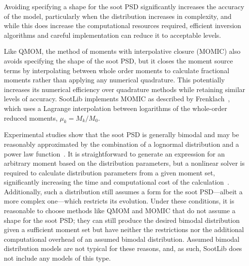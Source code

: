 \documentclass[preprint,letterpaper]{elsarticle}
\begin{document}
Avoiding specifying a shape for the soot PSD significantly increases the accuracy of the model, particularly when the distribution increases in complexity, and while this does increase the computational resources required, efficient inversion algorithms and careful implementation can reduce it to acceptable levels.


Like QMOM, the method of moments with interpolative closure (MOMIC) also avoids specifying the shape of the soot PSD, but it closes the moment source terms by interpolating between whole order moments to calculate fractional moments rather than applying any numerical quadrature. This potentially increases its numerical efficiency over quadrature methods while retaining similar levels of accuracy. SootLib implements MOMIC as described by Frenklach~\cite{Frenklach_2002b,Frenklach_1987}, which uses a Lagrange interpolation between logarithms of the  whole-order reduced moments, $\mu_k = M_k/M_0$.

Experimental studies show that the soot PSD is generally bimodal and may be reasonably approximated by the combination of a lognormal distribution and a power law function~\cite{Wang_2011}. It is straightforward to generate an expression for an arbitrary moment based on the distribution parameters, but a nonlinear solver is required to calculate distribution parameters from a given moment set, significantly increasing the time and computational cost of the calculation~\cite{Lignell_2008b}. Additionally, such a distribution still assumes a form for the soot PSD---albeit a more complex one---which restricts its evolution. Under these conditions, it is reasonable to choose methods like QMOM and MOMIC that do not assume a shape for the soot PSD; they can still produce the desired bimodal distribution given a sufficient moment set but have neither the restrictions nor the additional computational overhead of an assumed bimodal distribution. Assumed bimodal distribution models are not typical for these reasons, and, as such, SootLib does not include any models of this type.

\end{document}
